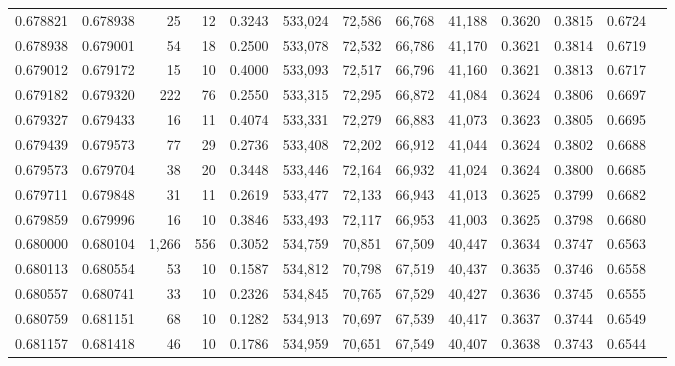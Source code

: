 \begin{tabular}{rrrrrrrrrrrrr}
0.678821 & 0.678938 &    25 &  12 &                                     0.3243 & 533,024 &  72,586 &  66,768 &  41,188 & 0.3620 & 0.3815 & 0.6724 \\
0.678938 & 0.679001 &    54 &  18 &                                     0.2500 & 533,078 &  72,532 &  66,786 &  41,170 & 0.3621 & 0.3814 & 0.6719 \\
0.679012 & 0.679172 &    15 &  10 &                                     0.4000 & 533,093 &  72,517 &  66,796 &  41,160 & 0.3621 & 0.3813 & 0.6717 \\
0.679182 & 0.679320 &   222 &  76 &                                     0.2550 & 533,315 &  72,295 &  66,872 &  41,084 & 0.3624 & 0.3806 & 0.6697 \\
0.679327 & 0.679433 &    16 &  11 &                                     0.4074 & 533,331 &  72,279 &  66,883 &  41,073 & 0.3623 & 0.3805 & 0.6695 \\
0.679439 & 0.679573 &    77 &  29 &                                     0.2736 & 533,408 &  72,202 &  66,912 &  41,044 & 0.3624 & 0.3802 & 0.6688 \\
0.679573 & 0.679704 &    38 &  20 &                                     0.3448 & 533,446 &  72,164 &  66,932 &  41,024 & 0.3624 & 0.3800 & 0.6685 \\
0.679711 & 0.679848 &    31 &  11 &                                     0.2619 & 533,477 &  72,133 &  66,943 &  41,013 & 0.3625 & 0.3799 & 0.6682 \\
0.679859 & 0.679996 &    16 &  10 &                                     0.3846 & 533,493 &  72,117 &  66,953 &  41,003 & 0.3625 & 0.3798 & 0.6680 \\
0.680000 & 0.680104 & 1,266 & 556 &                                     0.3052 & 534,759 &  70,851 &  67,509 &  40,447 & 0.3634 & 0.3747 & 0.6563 \\
0.680113 & 0.680554 &    53 &  10 &                                     0.1587 & 534,812 &  70,798 &  67,519 &  40,437 & 0.3635 & 0.3746 & 0.6558 \\
0.680557 & 0.680741 &    33 &  10 &                                     0.2326 & 534,845 &  70,765 &  67,529 &  40,427 & 0.3636 & 0.3745 & 0.6555 \\
0.680759 & 0.681151 &    68 &  10 &                                     0.1282 & 534,913 &  70,697 &  67,539 &  40,417 & 0.3637 & 0.3744 & 0.6549 \\
0.681157 & 0.681418 &    46 &  10 &                                     0.1786 & 534,959 &  70,651 &  67,549 &  40,407 & 0.3638 & 0.3743 & 0.6544 \\

\end{tabular}
